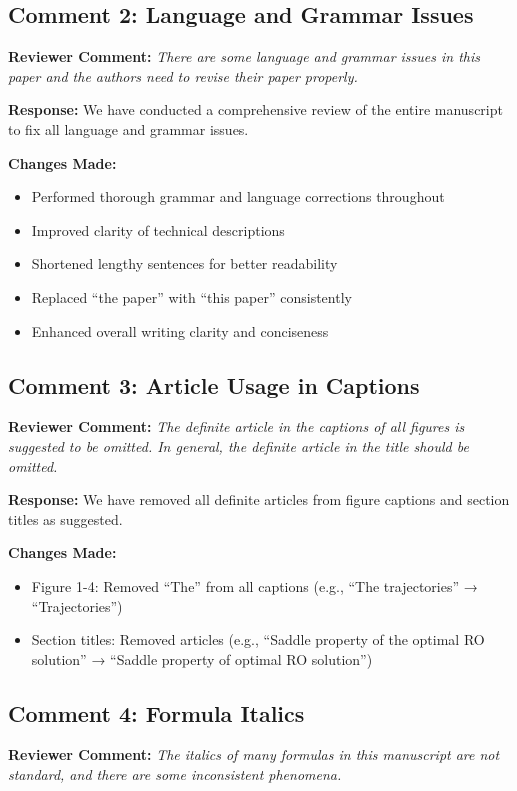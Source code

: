 \documentclass[11pt]{article}
\newcommand{\reviewercomment}[1]{\textbf{Reviewer Comment:} \textit{#1}}
\newcommand{\response}[1]{\textbf{Response:} #1}
\newcommand{\changes}[1]{\textbf{Changes Made:} #1}
\begin{document}
\subsection*{Comment 2: Language and Grammar Issues}

\reviewercomment{There are some language and grammar issues in this paper and the authors need to revise their paper properly.}

\response{We have conducted a comprehensive review of the entire manuscript to fix all language and grammar issues.}

\changes{
\begin{itemize}
\item Performed thorough grammar and language corrections throughout
\item Improved clarity of technical descriptions
\item Shortened lengthy sentences for better readability
\item Replaced ``the paper'' with ``this paper'' consistently
\item Enhanced overall writing clarity and conciseness
\end{itemize}
}

\subsection*{Comment 3: Article Usage in Captions}

\reviewercomment{The definite article in the captions of all figures is suggested to be omitted. In general, the definite article in the title should be omitted.}

\response{We have removed all definite articles from figure captions and section titles as suggested.}

\changes{
\begin{itemize}
\item Figure 1-4: Removed ``The'' from all captions (e.g., ``The trajectories'' → ``Trajectories'')
\item Section titles: Removed articles (e.g., ``Saddle property of the optimal RO solution'' → ``Saddle property of optimal RO solution'')
\end{itemize}
}

\subsection*{Comment 4: Formula Italics}

\reviewercomment{The italics of many formulas in this manuscript are not standard, and there are some inconsistent phenomena.}
\end{document}
